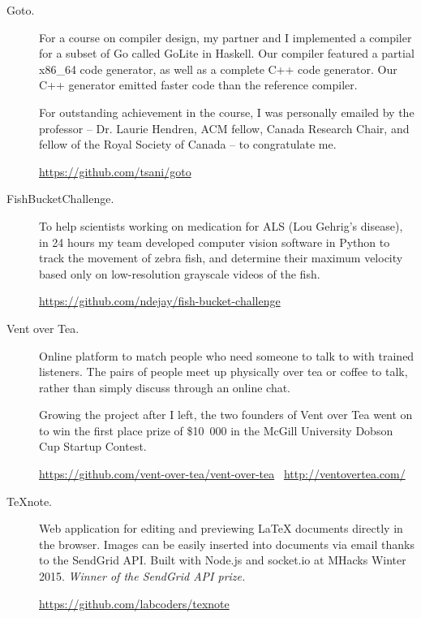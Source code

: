 \documentclass{article}
\begin{document}
\begin{description}
    \item[Goto.] For a course on compiler design, my partner and I implemented
        a compiler for a subset of Go called GoLite in Haskell. Our compiler
        featured a partial x86\_64 code generator, as well as a complete C++
        code generator. Our C++ generator emitted faster code than the
        reference compiler.

        For outstanding achievement in the course, I was personally emailed by
        the professor -- Dr. Laurie Hendren, ACM fellow, Canada Research Chair,
        and fellow of the Royal Society of Canada -- to congratulate me.

        \url{https://github.com/tsani/goto}



    \item[FishBucketChallenge.] To help scientists working on medication for
        ALS (Lou Gehrig's disease), in 24 hours my team developed computer
        vision software in Python to track the movement of zebra fish, and
        determine their maximum velocity based only on low-resolution grayscale
        videos of the fish.

        \url{https://github.com/ndejay/fish-bucket-challenge}



    \item[Vent over Tea.] Online platform to match people who need someone to
        talk to with trained listeners. The pairs of people meet up physically
        over tea or coffee to talk, rather than simply discuss through an
        online chat.

        Growing the project after I left, the two founders of Vent over Tea
        went on to win the first place prize of \$10~000 in the McGill
        University Dobson Cup Startup Contest.

        \url{https://github.com/vent-over-tea/vent-over-tea}~
        \url{http://ventovertea.com/}

    \item[TeXnote.] Web application for editing and previewing \LaTeX{} documents
        directly in the browser. Images can be easily inserted into documents
        via email thanks to the SendGrid API. Built with Node.js and
        socket.io at MHacks Winter 2015.
        \emph{Winner of the SendGrid API prize.}

        \url{https://github.com/labcoders/texnote}
\end{description}
\end{document}

